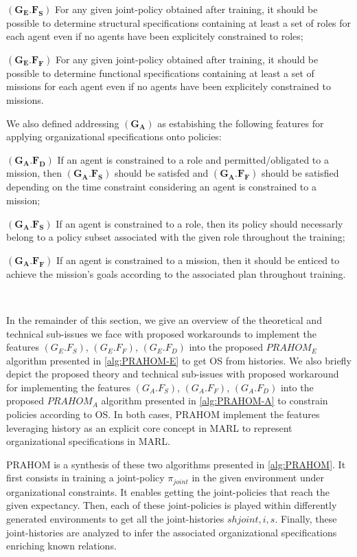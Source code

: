 \documentclass[runningheads]{llncs}
\newcounter{relation}
\begin{document}
\noindent $(\mathbf{G_E.F_S})$ \quad For any given joint-policy obtained after training, it should be possible to determine structural specifications containing at least a set of  roles for each agent even if no agents have been explicitely constrained to roles;

\noindent $(\mathbf{G_E.F_F})$ \quad For any given joint-policy obtained after training, it should be possible to determine functional specifications containing at least a set of  missions for each agent even if no agents have been explicitely constrained to missions.

We also defined addressing $(\mathbf{G_A})$ as estabishing the following features for applying organizational specifications onto policies:

\noindent $(\mathbf{G_A.F_D})$ \quad If an agent is constrained to a role and permitted/obligated to a mission, then $(\mathbf{G_A.F_S})$ should be satisfed and $(\mathbf{G_A.F_F})$ should be satisfied depending on the time constraint considering an agent is constrained to a mission;

\noindent $(\mathbf{G_A.F_S})$ \quad If an agent is constrained to a role, then its policy should necessarly belong to a policy subset associated with the given role throughout the training;

\noindent $(\mathbf{G_A.F_F})$ \quad If an agent is constrained to a mission, then it should be enticed to achieve the mission's goals according to the associated plan throughout training.

\

In the remainder of this section, we give an overview of the theoretical and technical sub-issues we face with proposed workarounds to implement the features $(G_E.F_S)$, $(G_E.F_F)$, $(G_E.F_D)$ into the proposed $PRAHOM_E$ algorithm presented in \autoref{alg:PRAHOM-E}
to get OS from histories. We also briefly depict the proposed theory and technical sub-issues with proposed workaround for implementing the features $(G_A.F_S)$, $(G_A.F_F)$, $(G_A.F_D)$ into the proposed $PRAHOM_A$ algorithm presented in \autoref{alg:PRAHOM-A} to constrain policies according to OS. In both cases, PRAHOM implement the features leveraging history as an explicit core concept in MARL to represent organizational specifications in MARL.

PRAHOM is a synthesis of these two algorithms presented in \autoref{alg:PRAHOM}. It first consists in training a joint-policy $\pi_{joint}$ in the given environment under organizational constraints. It enables getting the joint-policies that reach the given expectancy. Then, each of these joint-policies is played within differently generated environments to get all the joint-histories $sh{joint,i,s}$. Finally, these joint-histories are analyzed to infer the associated organizational specifications enriching known relations\footnotemark[1].
\end{document}
